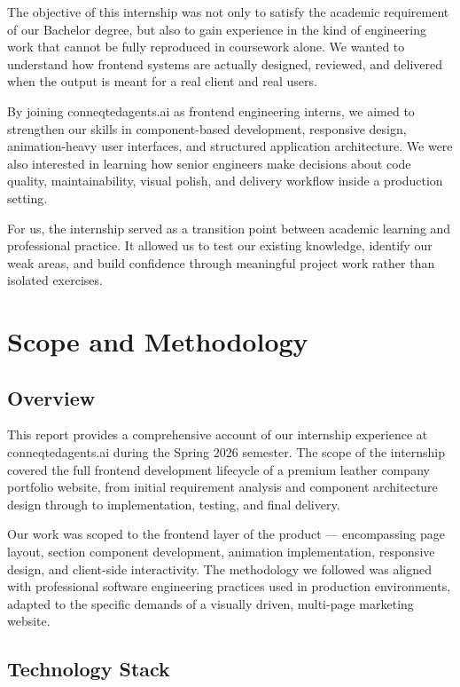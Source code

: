 \documentclass[12pt, oneside, a4paper]{book}
\begin{document}
\begin{doublespace}
The objective of this internship was not only to satisfy the academic requirement of our
Bachelor degree, but also to gain experience in the kind of engineering work that cannot
be fully reproduced in coursework alone. We wanted to understand how frontend systems are
actually designed, reviewed, and delivered when the output is meant for a real client and
real users.

By joining conneqtedagents.ai as frontend engineering interns, we aimed to strengthen our
skills in component-based development, responsive design, animation-heavy user interfaces,
and structured application architecture. We were also interested in learning how senior
engineers make decisions about code quality, maintainability, visual polish, and delivery
workflow inside a production setting.

For us, the internship served as a transition point between academic learning and
professional practice. It allowed us to test our existing knowledge, identify our weak
areas, and build confidence through meaningful project work rather than isolated exercises.

\section{Scope and Methodology}

\subsection{Overview}

This report provides a comprehensive account of our internship experience at
conneqtedagents.ai during the Spring 2026 semester. The scope of the internship covered
the full frontend development lifecycle of a premium leather company portfolio website,
from initial requirement analysis and component architecture design through to
implementation, testing, and final delivery.

Our work was scoped to the frontend layer of the product --- encompassing page layout,
section component development, animation implementation, responsive design, and
client-side interactivity. The methodology we followed was aligned with professional
software engineering practices used in production environments, adapted to the specific
demands of a visually driven, multi-page marketing website.

\subsection{Technology Stack}


\end{doublespace}
\end{document}
